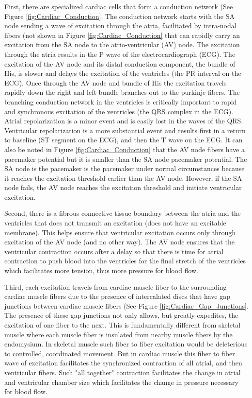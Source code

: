 First, there are specialized cardiac cells that form a conduction network (See Figure \ref{fig:Cardiac_Conduction}. The conduction network starts with the SA node sending a wave of excitation through the atria, facilitated by intra-nodal fibers (not shown in Figure \ref{fig:Cardiac_Conduction} that can rapidly carry an excitation from the SA node to the atrio-ventricular (AV) node. The excitation through the atria results in the P wave of the electrocardiograph (ECG). The excitation of the AV node and its distal conduction component, the bundle of His, is slower and delays the excitation of the ventricles (the PR interval on the ECG). Once through the AV node and bundle of His the excitation travels rapidly down the right and left bundle branches out to the purkinje fibers. The branching conduction network in the ventricles is critically important to rapid and synchronous excitation of the ventricles (the QRS complex in the ECG). Atrial repolarization is a minor event and is easily lost in the waves of the QRS. Ventricular repolarization is a more substantial event and results first in a return to baseline (ST segment on the ECG), and then the T wave on the ECG. It can also be noted in Figure \ref{fig:Cardiac_Conduction} that the AV node fibers have a pacemaker potential but it is smaller than the SA node pacemaker potential. The SA node is the pacemaker is the pacemaker under normal circumstances because it reaches the excitation threshold earlier than the AV node. However, if the SA node fails, the AV node reaches the excitation threshold and initiate ventricular excitation.

Second, there is a fibrous connective tissue boundary between the atria and the ventricles that does not transmit an excitation (does not have an excitable membrane). This helps ensure that ventricular excitation occurs only through excitation of the AV node (and no other way). The AV node ensures that the ventricular contraction occurs after a delay so that there is time for atrial contraction to push blood into the ventricles for the final stretch of the ventricles which facilitates more tension, thus more pressure for blood flow.

Third, each excitation travels from cardiac muscle fiber to the surrounding cardiac muscle fibers due to the presence of intercalated discs that have gap junctions between cardiac muscle fibers (See Figure \ref{fig:Cardiac_Gap_Junctions}. The presence of these gap junctions not only allows, but greatly expedites, the excitation of one fiber to the next. This is fundamentally different from skeletal muscle where each muscle fiber is insulated from nearby muscle fibers by the endomysium. In skeletal muscle such fiber to fiber excitation would be deleterious to controlled, coordinated movement. But in cardiac muscle this fiber to fiber wave of excitation facilitates the synchronized contraction of all atrial, and then ventricular fibers. Such "all together" contraction facilitates the change in atrial and ventricular chamber size which facilitates the change in pressure necessary for blood flow.

